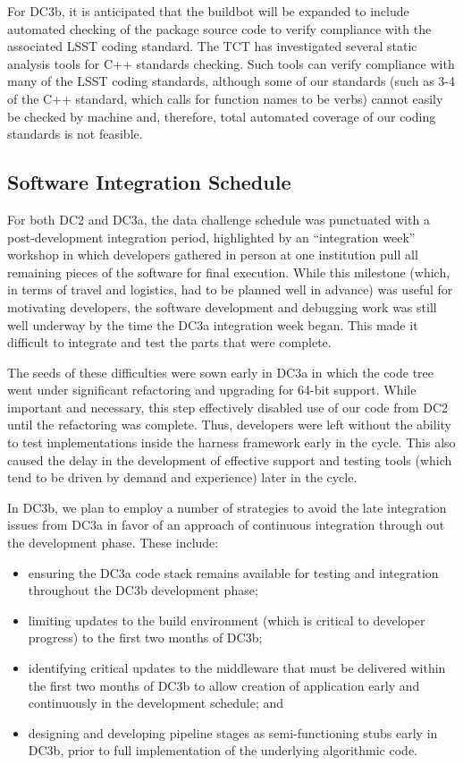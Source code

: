 For DC3b, it is anticipated that the buildbot will be expanded to include
automated checking of the package source code to verify compliance with
the associated LSST coding standard. The TCT has investigated several
static analysis tools for C++ standards checking. Such tools can verify
compliance with many of the LSST coding standards, although some of
our standards (such as 3-4 of the C++ standard, which calls for function
names to be verbs) cannot easily be checked by machine and, therefore,
total automated coverage of our coding standards is not feasible.

\subsection{Software Integration Schedule}

For both DC2 and DC3a, the data challenge schedule was punctuated with
a post-development integration period, highlighted by an
``integration week'' workshop in which developers gathered in person
at one institution pull all remaining pieces of the software for
final execution.  While this milestone (which, in terms of travel and
logistics, had to be planned well in advance) was useful for
motivating developers, the software development and debugging work was
still well underway by the time the DC3a integration week began.  This
made it difficult to integrate and test the parts that were complete.  

The seeds of these difficulties were sown early in DC3a in which the
code tree went under significant refactoring and upgrading for 64-bit
support.  While important and necessary, this step effectively disabled use
of our code from DC2 until the refactoring was complete.  Thus,
developers were left without the ability to test implementations
inside the harness framework early in the cycle.  This also caused the
delay in the development of effective support and testing tools (which
tend to be driven by demand and experience) later in the cycle.

In DC3b, we plan to employ a number of strategies to avoid the late
integration issues from DC3a in favor of an approach of continuous
integration through out the development phase.  These include:

\begin{itemize}
\item ensuring the DC3a code stack remains available for testing and
  integration throughout the DC3b development phase;
\item limiting updates to the build environment (which is critical to
  developer progress) to the first two months of DC3b;
\item identifying critical updates to the middleware that must be
  delivered within the first two months of DC3b to allow 
  creation of application early and continuously in the development
  schedule; and 
\item designing and developing pipeline stages as semi-functioning stubs
  early in DC3b, prior to full implementation of the underlying
  algorithmic code.  
\end{itemize}

